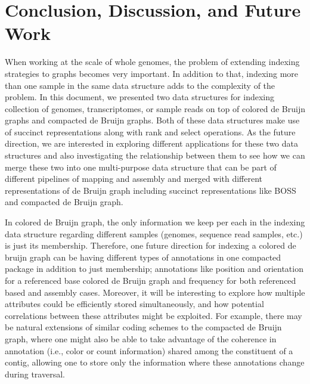 \chapter{Conclusion, Discussion, and Future Work}

When working at the scale of whole genomes, the problem of extending indexing strategies to graphs becomes very important. In addition to that, indexing more than one sample in the same data structure adds to the complexity of the problem. In this document, we presented two data structures for indexing collection of genomes, transcriptomes, or sample reads on top of colored de Bruijn graphs and compacted de Bruijn graphs. Both of these data structures make use of succinct representations along with rank and select operations. As the future direction, we are interested in exploring different applications for these two data structures and also investigating the relationship between them to see how we can merge these two into one multi-purpose data structure that can be part of different pipelines of mapping and assembly and merged with different representations of de Bruijn graph including succinct representations like BOSS and compacted de Bruijn graph.

In colored de Bruijn graph, the only information we keep per each \kmer in the indexing data structure regarding different samples (genomes, sequence read samples, etc.) is just its membership. Therefore, one future direction for indexing a colored de bruijn graph can be having different types of annotations in one compacted package in addition to just membership; annotations like position and orientation for a referenced base colored de Bruijn graph and frequency for both referenced based and assembly cases.
Moreover, it will be interesting to explore how multiple attributes could be efficiently stored simultaneously, and how potential correlations between these attributes might be exploited. For example, there may be natural extensions of similar coding schemes to the compacted de Bruijn graph, where one might also be able to take advantage of the coherence in annotation (i.e., color or count information) shared among the constituent \kmers of a contig, allowing one to store only the information where these annotations change during traversal.

